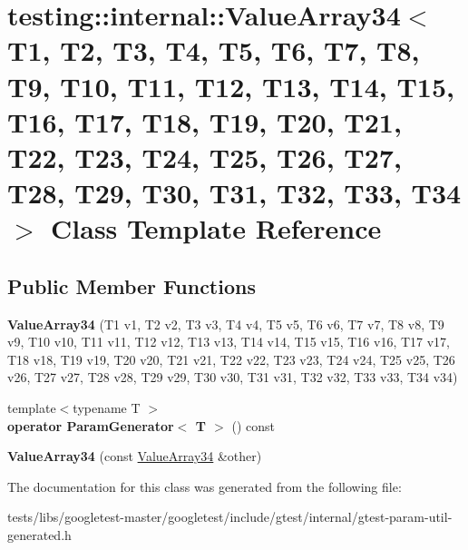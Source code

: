 \hypertarget{classtesting_1_1internal_1_1ValueArray34}{}\section{testing\+:\+:internal\+:\+:Value\+Array34$<$ T1, T2, T3, T4, T5, T6, T7, T8, T9, T10, T11, T12, T13, T14, T15, T16, T17, T18, T19, T20, T21, T22, T23, T24, T25, T26, T27, T28, T29, T30, T31, T32, T33, T34 $>$ Class Template Reference}
\label{classtesting_1_1internal_1_1ValueArray34}
\subsection*{Public Member Functions}
\begin{DoxyCompactItemize}
\item 
\mbox{\label{classtesting_1_1internal_1_1ValueArray34_a25aad9698b9d6fd45743dc86f973be09}} 
{\bfseries Value\+Array34} (T1 v1, T2 v2, T3 v3, T4 v4, T5 v5, T6 v6, T7 v7, T8 v8, T9 v9, T10 v10, T11 v11, T12 v12, T13 v13, T14 v14, T15 v15, T16 v16, T17 v17, T18 v18, T19 v19, T20 v20, T21 v21, T22 v22, T23 v23, T24 v24, T25 v25, T26 v26, T27 v27, T28 v28, T29 v29, T30 v30, T31 v31, T32 v32, T33 v33, T34 v34)
\item 
\mbox{\label{classtesting_1_1internal_1_1ValueArray34_a810547b4fed5bd0e5ed636272ad279b4}} 
{\footnotesize template$<$typename T $>$ }\\{\bfseries operator Param\+Generator$<$ T $>$} () const
\item 
\mbox{\label{classtesting_1_1internal_1_1ValueArray34_aaa146943f507ec601268c5cac4f402a7}} 
{\bfseries Value\+Array34} (const \hyperlink{classtesting_1_1internal_1_1ValueArray34}{Value\+Array34} \&other)
\end{DoxyCompactItemize}


The documentation for this class was generated from the following file\+:\begin{DoxyCompactItemize}
\item 
tests/libs/googletest-\/master/googletest/include/gtest/internal/gtest-\/param-\/util-\/generated.\+h\end{DoxyCompactItemize}

